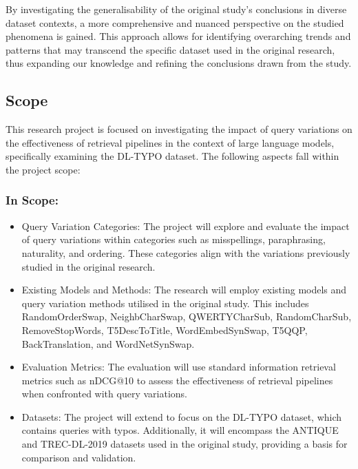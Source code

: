 By investigating the generalisability of the original study's conclusions in diverse dataset contexts, a more comprehensive and nuanced perspective on the studied phenomena is gained. This approach allows for identifying overarching trends and patterns that may transcend the specific dataset used in the original research, thus expanding our knowledge and refining the conclusions drawn from the study. 

\subsection{Scope}
This research project is focused on investigating the impact of query variations on the effectiveness of retrieval pipelines in the context of large language models, specifically examining the DL-TYPO dataset. The following aspects fall within the project scope:

\subsubsection{In Scope:}
\begin{itemize}
    \item Query Variation Categories: The project will explore and evaluate the impact of query variations within categories such as misspellings, paraphrasing, naturality, and ordering. These categories align with the variations previously studied in the original research.
    \item Existing Models and Methods: The research will employ existing models and query variation methods utilised in the original study. This includes RandomOrderSwap, NeighbCharSwap, QWERTYCharSub, RandomCharSub, RemoveStopWords, T5DescToTitle, WordEmbedSynSwap, T5QQP, BackTranslation, and WordNetSynSwap.
    \item Evaluation Metrics: The evaluation will use standard information retrieval metrics such as nDCG@10 to assess the effectiveness of retrieval pipelines when confronted with query variations.
    \item Datasets: The project will extend to focus on the DL-TYPO dataset, which contains queries with typos. Additionally, it will encompass the ANTIQUE and TREC-DL-2019 datasets used in the original study, providing a basis for comparison and validation.
\end{itemize}

